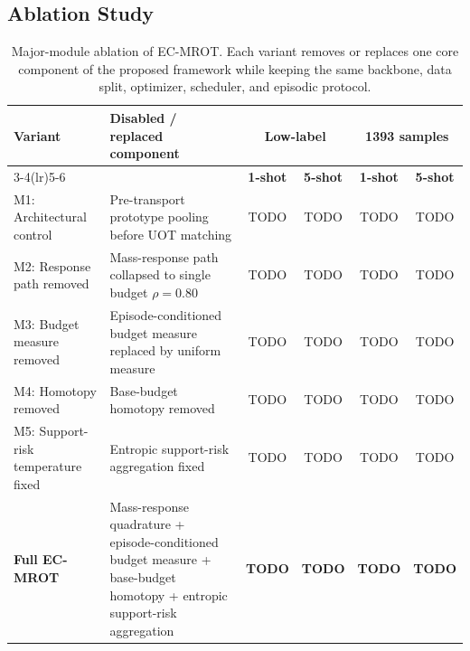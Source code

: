 \documentclass[journal]{IEEEtran}
\newcommand{\method}{EC-MROT}
\newcommand{\1}{\mathbf{1}}
\begin{document}
\subsection{Ablation Study}

\begin{table}[t]
\centering
\caption{Major-module ablation of \method{}. Each variant removes or replaces one core component of the proposed framework while keeping the same backbone, data split, optimizer, scheduler, and episodic protocol.}
\label{tab:ecmrot_major_module_ablation}
\renewcommand{\arraystretch}{1.15}
\setlength{\tabcolsep}{3.2pt}
\scriptsize
\begin{tabular}{l l c c c c}
\toprule
\textbf{Variant} &
\textbf{Disabled / replaced component} &
\multicolumn{2}{c}{\textbf{Low-label}} &
\multicolumn{2}{c}{\textbf{1393 samples}} \\
\cmidrule(lr){3-4}\cmidrule(lr){5-6}
 & & \textbf{1-shot} & \textbf{5-shot} & \textbf{1-shot} & \textbf{5-shot} \\
\midrule
M1: Architectural control
& Pre-transport prototype pooling before UOT matching
& TODO & TODO & TODO & TODO \\

M2: Response path removed
& Mass-response path collapsed to single budget $\rho=0.80$
& TODO & TODO & TODO & TODO \\

M3: Budget measure removed
& Episode-conditioned budget measure replaced by uniform measure
& TODO & TODO & TODO & TODO \\

M4: Homotopy removed
& Base-budget homotopy removed
& TODO & TODO & TODO & TODO \\

M5: Support-risk temperature fixed
& Entropic support-risk aggregation fixed
& TODO & TODO & TODO & TODO \\

\textbf{Full \method{}}
& Mass-response quadrature + episode-conditioned budget measure + base-budget homotopy + entropic support-risk aggregation
& \textbf{TODO} & \textbf{TODO} & \textbf{TODO} & \textbf{TODO} \\
\bottomrule
\end{tabular}
\end{table}
\end{document}
